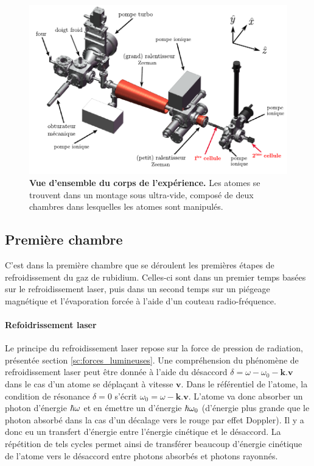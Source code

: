 \begin{figure}
\centering
\includegraphics[width=\textwidth]{Fig/BEC_manip/manip.pdf}
\caption{\textbf{Vue d'ensemble du corps de l'expérience.} Les atomes se trouvent dans un montage sous ultra-vide, composé de deux chambres dans lesquelles les atomes sont manipulés.}
\label{fig:manip}
\end{figure}

\subsection{Première chambre}
C'est dans la première chambre que se déroulent les premières étapes de refroidissement du gaz de rubidium. Celles-ci sont dans un premier temps basées sur le refroidissement laser, puis dans un second temps sur un piégeage magnétique et l'évaporation forcée à l'aide d'un couteau radio-fréquence.

\paragraph*{Refoidrissement laser}
Le principe du refroidissement laser repose sur la force de pression de radiation, présentée section \ref{sc:forces_lumineuses}. Une compréhension du phénomène de refroidissement laser peut être donnée à l'aide du désaccord $\delta=\omega-\omega_0- \mathbf{k}. \mathbf{v}$ dans le cas d'un atome se déplaçant à vitesse $\mathbf{v}$.
Dans le référentiel de l'atome, la condition de résonance $\delta=0$ s'écrit $\omega_0=\omega-\mathbf{k}.\mathbf{v}$. L'atome va donc absorber un photon d'énergie $\hslash \omega$ et en émettre un d'énergie $\hslash \omega_0$ (d'énergie plus grande que le photon absorbé dans la cas d'un décalage vers le rouge par effet Doppler). Il y a donc eu un transfert d'énergie entre l'énergie cinétique et le désaccord. La répétition de tels cycles permet ainsi de transférer beaucoup d'énergie cinétique de l'atome vers le désaccord entre photons absorbés et photons rayonnés.

